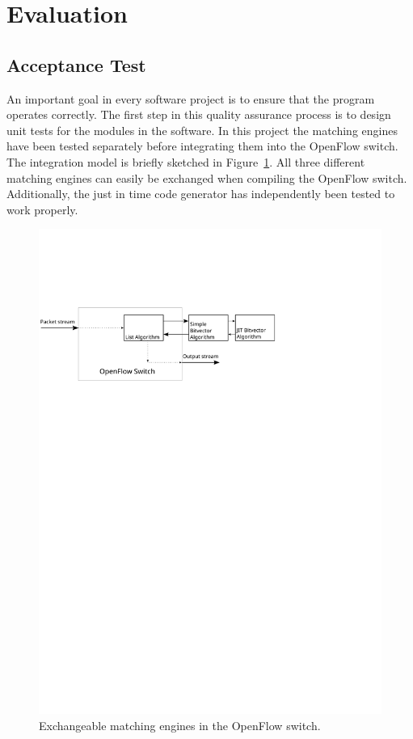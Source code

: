\documentclass[a4paper,
		12pt,
		parskip=full,
		titlepage
		]{scrartcl}
\begin{document}
\section{Evaluation}
\subsection{Acceptance Test}
An important goal in every software project is to ensure that the program operates correctly.
The first step in this quality assurance process is to design unit tests for the modules in the software.
In this project the matching engines have been tested separately before integrating them into the OpenFlow switch.
The integration model is briefly sketched in Figure~\ref{fig:ofswitch}.
All three different matching engines can easily be exchanged when compiling the OpenFlow switch.
Additionally, the just in time code generator has independently been tested to work properly.

\begin{figure}
\centering
\includegraphics[height=0.2\textheight]{images/ofswitch}
\caption{Exchangeable matching engines in the OpenFlow switch.}
\label{fig:ofswitch}
\end{figure}
\end{document}
